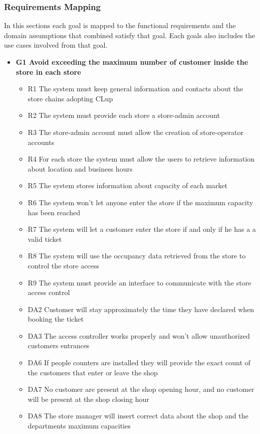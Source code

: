\subsubsection{Requirements Mapping}
In this sections each goal is mapped to the functional requirements and the domain assumptions that combined satisfy that goal. Each goals also includes the use cases involved from that goal.
\bigskip
\begin{itemize}
    \item \textbf{G1 Avoid exceeding the maximum number of customer inside the store in each store}
    \begin{itemize}
        \item R1 The system must keep general information and contacts about the store chains adopting CLup
        \item R2 The system must provide each store a store-admin account
        \item R3 The store-admin account must allow the creation of store-operator accounts
        \item R4 For each store the system must allow the users to retrieve information about location and business hours
        \item R5 The system stores information about capacity of each market
        \item R6 The system won’t let anyone enter the store if the maximum capacity has been reached
        \item R7 The system will let a customer enter the store if and only if he has a a valid ticket
        \item R8 The system will use the occupancy data retrieved from the store to control the store access
        \item R9 The system must provide an interface to communicate with the store access control
        \medskip
        \item DA2 Customer will stay approximately the time they have declared when booking the ticket
        \item DA3 The access controller works properly and won't allow unauthorized customers entrances
        \item DA6 If people counters are installed they will provide the exact count of the customers that enter or leave the shop
        \item DA7 No customer are present at the shop opening hour, and no customer will be present at the shop closing hour
        \item DA8 The store manager will insert correct data about the shop and the departments maximum capacities

\end{itemize}
\end{itemize}
